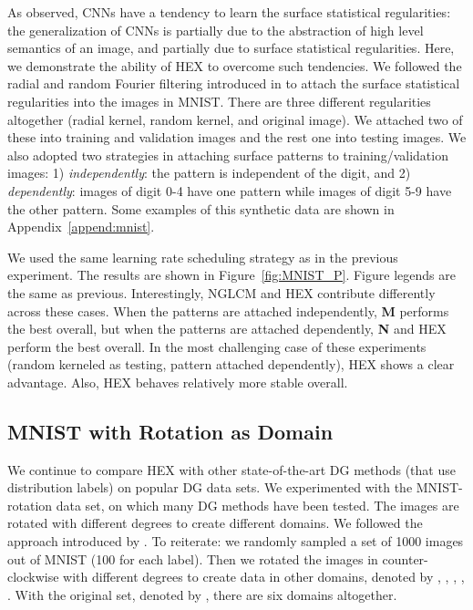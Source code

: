 As \citet{jo2017measuring} observed, 
CNNs have a tendency to learn the surface statistical regularities: 
the generalization of CNNs is partially due to the abstraction of high level semantics of an image, 
and partially due to surface statistical regularities. 
Here, we demonstrate the ability of HEX to overcome such tendencies.
We followed the radial and random Fourier filtering 
introduced in \citep{jo2017measuring} 
to attach the surface statistical regularities 
into the images in MNIST. 
There are three different regularities altogether 
(radial kernel, random kernel, and original image). 
We attached two of these into training and validation images 
and the rest one into testing images. 
We also adopted two strategies in attaching surface patterns to training/validation images: 
1) \textit{independently}: the pattern is independent of the digit,
and 2) \textit{dependently}:
images of digit 0-4 have one pattern while images of digit 5-9 
have the other pattern. 
Some examples of this synthetic data are shown in Appendix~\ref{append:mnist}. 


We used the same learning rate scheduling strategy 
as in the previous experiment. 
The results are shown in Figure~\ref{fig:MNIST_P}.
Figure legends are the same as previous. 
Interestingly, NGLCM and HEX contribute differently across these cases. 
When the patterns are attached independently,
\textbf{M} performs the best overall, 
but when the patterns are attached dependently,
\textbf{N} and HEX perform the best overall.
In the most challenging case of these experiments 
(random kerneled as testing, pattern attached dependently),
HEX shows a clear advantage. 
Also, HEX behaves relatively more stable overall. 


\subsection{MNIST with Rotation as Domain}
We continue to compare HEX with other state-of-the-art DG methods 
(that use distribution labels) on popular DG data sets. 
We experimented with the MNIST-rotation data set, 
on which many DG methods have been tested. 
The images are rotated with different degrees to create different domains. We followed the approach introduced by \citet{ghifary2015domain}.
To reiterate: we randomly sampled a set  of 1000 images 
out of MNIST (100 for each label). 
Then we rotated the images in  counter-clockwise 
with different degrees to create data in other domains, 
denoted by , , , , . 
With the original set, denoted by ,
there are six domains altogether. 

